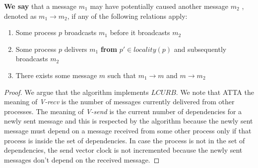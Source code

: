 \documentclass[a4paper]{article}
\begin{document}
{\bf We say} that a message $m_1$ may have potentially caused another message $m_2$ , denoted as $m_1\to m_2$, if any of the following relations apply:
\begin{enumerate}
	\item Some process $p$ broadcasts $m_1$ before it broadcasts $m_2$
	\item Some process $p$ delivers $m_1$ {\bf from} $p'\in \textit{locality}(p)$ and subsequently broadcasts $m_2$
	\item There exists some message $m$ such that $m_1 \to m$ and $m \to m_2$
\end{enumerate}

\begin{proof}
We argue that the algorithm implements $LCURB$. We note that ATTA the meaning of {\it V-recv} is the number of messages currently delivered from other processes. The meaning of {\it V-send} is the current number of dependencies for a newly sent message and this is respected by the algorithm because the newly sent message must depend on a message received from some other process only if that process is inside the set of dependencies. In case the process is not in the set of dependencies, the send vector clock is not incremented because the newly sent messages don't depend on the received message.


\end{proof}
\end{document}
